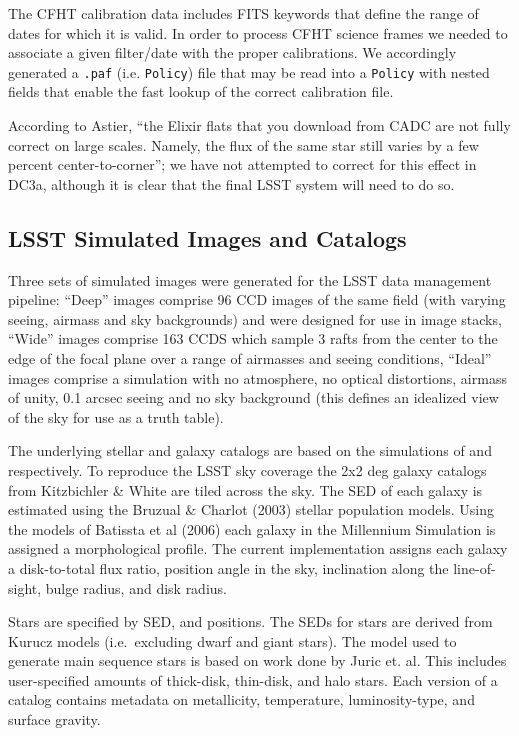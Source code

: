 The CFHT calibration data includes FITS keywords that define the range
of dates for which it is valid.  In order to process CFHT science frames
we needed to associate a given filter/date with the proper calibrations.  We
accordingly generated a \texttt{.paf} (i.e. \texttt{Policy}) file that may
be read into a \texttt{Policy} with nested fields that enable the fast
lookup of the correct calibration file.

According to Astier, ``the Elixir flats that you download from CADC
are not fully correct on large scales. Namely, the flux of the same
star still varies by a few percent center-to-corner'';  we have not
attempted to correct for this effect in DC3a,  although it is clear
that the final LSST system will need to do so.

\subsection{LSST Simulated Images and Catalogs}

Three sets of simulated images were generated for the LSST data
management pipeline: ``Deep'' images comprise 96 CCD images of the
same field (with varying seeing, airmass and sky backgrounds) and were
designed for use in image stacks, ``Wide'' images comprise 163 CCDS
which sample 3 rafts from the center to the edge of the focal plane
over a range of airmasses and seeing conditions, ``Ideal'' images
comprise a simulation with no atmosphere, no optical distortions,
airmass of unity, 0.1 arcsec seeing and no sky background (this
defines an idealized view of the sky for use as a truth table).

The underlying stellar and galaxy catalogs are based on the
simulations of \cite{Juric+Ivesic} and \cite{kitzbischler}
respectively.  To reproduce the LSST sky coverage the 2x2 deg galaxy
catalogs from Kitzbichler & White are tiled across the sky.  The SED
of each galaxy is estimated using the Bruzual & Charlot (2003) stellar
population models. Using the models of Batissta et al (2006) each
galaxy in the Millennium Simulation is assigned a morphological
profile. The current implementation assigns each galaxy a
disk-to-total flux ratio, position angle in the sky, inclination along
the line-of-sight, bulge radius, and disk radius.

Stars are specified by SED, and positions. The SEDs for stars are
derived from Kurucz models (i.e.\ excluding dwarf and giant
stars). The model used to generate main sequence stars is based on
work done by Juric et. al. This includes user-specified amounts of
thick-disk, thin-disk, and halo stars. Each version of a catalog
contains metadata on metallicity, temperature, luminosity-type, and
surface gravity.

